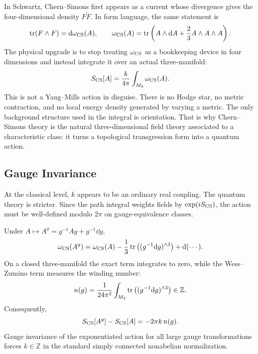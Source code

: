 In Schwartz, Chern--Simons first appears as a current whose divergence gives the four-dimensional density $F\widetilde F$. In form language, the same statement is
\begin{equation}
  \operatorname{tr}(F\wedge F)=\mathrm{d}\omega_{\operatorname{CS}}(A),
  \qquad
  \omega_{\operatorname{CS}}(A)
  =
  \operatorname{tr}\left(A\wedge\mathrm{d} A+\frac23 A\wedge A\wedge A\right).
  \label{eq:synthesis-transgression}
\end{equation}
The physical upgrade is to stop treating $\omega_{\operatorname{CS}}$ as a bookkeeping device in four dimensions and instead integrate it over an actual three-manifold:
\begin{equation}
  S_{\operatorname{CS}}[A]
  =
  \frac{k}{4\pi}\int_{M_3}\omega_{\operatorname{CS}}(A).
  \label{eq:synthesis-cs-action}
\end{equation}
This is not a Yang--Mills action in disguise. There is no Hodge star, no metric contraction, and no local energy density generated by varying a metric. The only background structure used in the integral is orientation. That is why Chern--Simons theory is the natural three-dimensional field theory associated to a characteristic class: it turns a topological transgression form into a quantum action.

\subsection{Gauge Invariance}
\label{subsec:synthesis-level}

At the classical level, $k$ appears to be an ordinary real coupling. The quantum theory is stricter. Since the path integral weights fields by $\exp(iS_{\operatorname{CS}})$, the action must be well-defined modulo $2\pi$ on gauge-equivalence classes.

Under $A\mapsto A^g=g^{-1}Ag+g^{-1}\dd g$,
\begin{equation}
  \omega_{\operatorname{CS}}(A^g)
  =
  \omega_{\operatorname{CS}}(A)
  -
  \frac13\operatorname{tr}\left((g^{-1}\mathrm{d} g)^{\wedge 3}\right)
  +
  \mathrm{d}(\cdots).
  \label{eq:synthesis-cs-transform}
\end{equation}
On a closed three-manifold the exact term integrates to zero, while the Wess--Zumino term measures the winding number:
\begin{equation}
  n(g)
  =
  \frac{1}{24\pi^2}\int_{M_3}
  \operatorname{tr}\left((g^{-1}\mathrm{d} g)^{\wedge 3}\right)
  \in\mathbb Z.
  \label{eq:synthesis-winding}
\end{equation}
Consequently,
\begin{equation}
  S_{\operatorname{CS}}[A^g]-S_{\operatorname{CS}}[A]
  =
  -2\pi k\,n(g).
  \label{eq:synthesis-level-shift}
\end{equation}
Gauge invariance of the exponentiated action for all large gauge transformations forces $k\in\mathbb Z$ in the standard simply connected nonabelian normalization.

